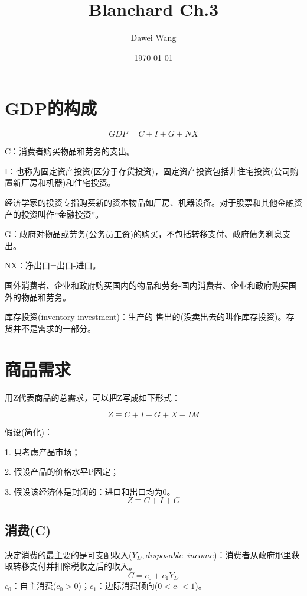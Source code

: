 \documentclass{article}
\title{Blanchard Ch.3}
\author{Dawei Wang}
\date{\today}
\begin{document}
	\maketitle
\section{GDP的构成}
\[
GDP=C+I+G+NX
\]


C：消费者购买物品和劳务的支出。

\hspace*{\fill}

I：也称为固定资产投资(区分于存货投资)，固定资产投资包括非住宅投资(公司购置新厂房和机器)和住宅投资。

经济学家的投资专指购买新的资本物品如厂房、机器设备。对于股票和其他金融资产的投资叫作“金融投资”。

\hspace*{\fill}

G：政府对物品或劳务(公务员工资)的购买，不包括转移支付、政府债务利息支出。

\hspace*{\fill}

NX：净出口=出口-进口。

国外消费者、企业和政府购买国内的物品和劳务-国内消费者、企业和政府购买国外的物品和劳务。

\hspace*{\fill}

库存投资(inventory investment)：生产的-售出的(没卖出去的叫作库存投资)。存货并不是需求的一部分。


\section{商品需求}
用Z代表商品的总需求，可以把Z写成如下形式：

\[
Z\equiv C+I+G+X-IM
\]

假设(简化)：

1. 只考虑产品市场；

2. 假设产品的价格水平P固定；

3. 假设该经济体是封闭的：进口和出口均为0。
\[
Z\equiv C+I+G
\]

\subsection{消费(C)}
决定消费的最主要的是可支配收入($ Y_D , disposable\enspace income$)：消费者从政府那里获取转移支付并扣除税收之后的收入。
\[
C=c_0+c_1Y_D
\]
$ c_0 $：自主消费($ c_0>0 $)；$ c_1 $：边际消费倾向($ 0<c_1<1 $)。
\end{document}
